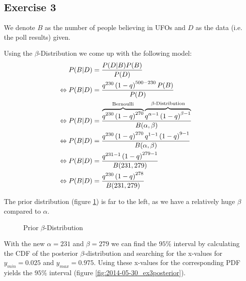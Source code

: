 \subsection*{Exercise 3}
We denote $B$ as the number of people believing in UFOs and $D$ as the data (i.e. the poll results) given.

Using the $\beta$-Distribution we come up with the following model:
\begin{align*}\index{Bernoulli Distribution}
                P(B|D) &= \frac{P(D|B)P(B)}{P(D)} \\
\Leftrightarrow P(B|D) &= \frac{q^{230}\left(1-q\right)^{500-230}P(B)}{P(D)}\\
\Leftrightarrow P(B|D) &= \frac{\overbrace{q^{230}\left(1-q\right)^{270}}^\text{Bernoulli} \overbrace{q^{\alpha-1}\left(1-q\right)^{\beta-1}}^\text{$\beta$-Distribution}}{B(\alpha,\beta)} \\
\Leftrightarrow P(B|D) &= \frac{q^{230}\left(1-q\right)^{270} q^{1-1}\left(1-q\right)^{9-1}}{B(\alpha,\beta)} \\
\Leftrightarrow P(B|D) &= \frac{q^{231-1}\left(1-q\right)^{279-1}}{B(231,279)} \\
\Leftrightarrow P(B|D) &= \frac{q^{230}\left(1-q\right)^{278}}{B(231,279)}
\end{align*}

The prior distribution (figure \ref{fig:2014-05-30_ex3prior}) is far to the left, as we have a relatively huge $\beta$ compared to $\alpha$.

\begin{figure}[!ht]
\centering
{}
\caption{Prior $\beta$-Distribution}
\label{fig:2014-05-30_ex3prior}
\end{figure}

With the new $\alpha = 231$ and $\beta = 279$ we can find the $95\%$ interval by calculating the CDF of the posterior $\beta$-distribution and searching for the x-values for $y_{min}=0.025$ and $y_{max}=0.975$. Using these x-values for the corresponding PDF yields the $95\%$ interval (figure \ref{fig:2014-05-30_ex3posterior}).

